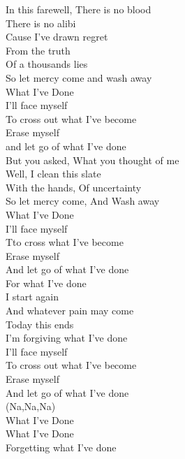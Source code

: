 In this farewell, There is no blood \\
There is no alibi \\
Cause I've drawn regret \\
From the truth \\
Of a thousands lies \\
So let mercy come and wash away \\
What I've Done \\
I'll face myself \\
To cross out what I've become \\
Erase myself \\
and let go of what I've done \\[1em]
But you asked, What you thought of me \\
Well, I clean this slate \\
With the hands, Of uncertainty \\
So let mercy come, And Wash away \\
What I've Done \\
I'll face myself \\
Tto cross what I've become \\
Erase myself \\
And let go of what I've done \\
For what I've done \\
I start again \\
And whatever pain may come \\
Today this ends \\
I'm forgiving what I've done \\
I'll face myself \\
To cross out what I've become \\
Erase myself \\
And let go of what I've done \\
(Na,Na,Na) \\
What I've Done \\
What I've Done \\
Forgetting what I've done
